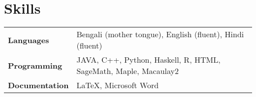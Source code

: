 \resumeSubHeadingListEnd




\section{Skills}

\begin{tabular*}{\textwidth}{l @{\hskip 0.5in} l}
\textbf{Languages} & Bengali (mother tongue), English (fluent), Hindi (fluent)\\
\textbf{Programming}  & {JAVA, C++, Python, Haskell, R, HTML, SageMath, Maple, Macaulay2} \\
\textbf {Documentation} & {\LaTeX, Microsoft Word} \\
\end{tabular*}









